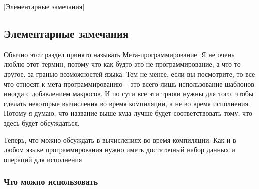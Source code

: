 [Элементарные замечания]


\subsection{Элементарные замечания}

Обычно этот раздел принято называть Мета-программирование.
Я не очень люблю этот термин, потому что как будто это не программирование, а что-то другое, за гранью возможностей языка.
Тем не менее, если вы посмотрите, то все что относят к мета программированию -- это всего лишь использование шаблонов иногда с добавлением макросов.
И по сути все эти трюки нужны для того, чтобы сделать некоторые вычисления во время компиляции, а не во время исполнения.
Потому я думаю, что название выше куда лучше будет соответствовать тому, что здесь будет обсуждаться.

Теперь, что можно обсуждать в вычислениях во время компиляции.
Как и в любом языке программирования нужно иметь достаточный набор данных и операций для исполнения.

\subsubsection{Что можно использовать}


